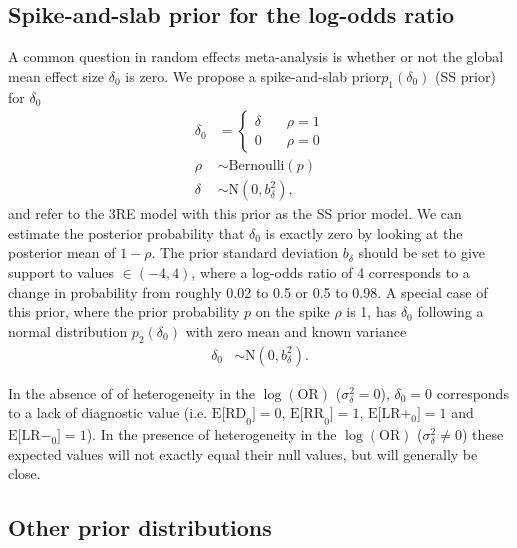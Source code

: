 \documentclass[AMA,STIX1COL]{WileyNJD-v2}
\begin{document}
\subsection{Spike-and-slab prior for the log-odds ratio} \label{sec:spike}

A common question in random effects meta-analysis is whether or not the global mean effect size $\delta_0$ is zero. We propose a spike-and-slab prior$p_1(\delta_0)$ (SS prior) for $\delta_0$
\begin{align}
\delta_0 & = \left\{
		\begin{array}{ll}
			\delta &\quad \rho = 1 \\
			0 &\quad \rho = 0
		\end{array}
		\right. \label{eq:delta0spike}\\
\rho &\sim \mbox{Bernoulli}(p) \label{eq:spike} \\
\delta &\sim \mbox{N}(0, b_\delta^2), \label{eq:delta}
\end{align}
\noindent and refer to the 3RE model with this prior as the SS prior model. We can estimate the posterior probability that $\delta_0$ is exactly zero by looking at the posterior mean of $1 - \rho$. The prior standard deviation $b_\delta$ should be set to give support to values $\in (-4, 4)$, where a log-odds ratio of 4 corresponds to a change in probability from roughly 0.02 to 0.5 or 0.5 to 0.98. A special case of this prior, where the prior probability $p$ on the spike $\rho$ is 1, has $\delta_0$ following a normal distribution $p_2(\delta_0)$ with zero mean and known variance
\begin{align}
\delta_0 &\sim \mbox{N}(0, b_\delta^2). \label{eq:delta0}
\end{align}

In the absence of of heterogeneity in the $\log(\mbox{OR})$ ($\sigma^2_\delta = 0$), $\delta_0 = 0$ corresponds to a lack of diagnostic value (i.e. $\mbox{E[RD}_0] = 0$, $\mbox{E[RR}_0] = 1$, $\mbox{E[LR}+_0] = 1$ and $\mbox{E[LR}-_0] = 1$). In the presence of heterogeneity in the $\log(\mbox{OR})$ ($\sigma^2_\delta \ne 0$) these expected values will not exactly equal their null values, but will generally be close.

\subsection{Other prior distributions} \label{sec:priors}
\end{document}
